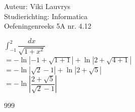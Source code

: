 \documentclass[a4paper]{article}
\begin{document}
  
\noindent \large Auteur: Viki	Lauvrys \\
\noindent \large Studierichting: Informatica\\
\noindent \large Oefeningenreeks 5A nr. 4.12\\

\medskip

\normalsize

$ \displaystyle\int^2_{-1} \dfrac{dx}{\sqrt{1 + x^2}} $ \\

$ = - \ln | -1 + \sqrt{1 + 1} | + \ln | 2 + \sqrt{4 + 1} | $ \\

$ = - \ln | \sqrt{2} - 1| + \ln | 2 + \sqrt{5} | $ \\

$ = - \ln \left| \dfrac{2 + \sqrt{5}}{\sqrt{2} - 1} \right| $ \\

\begin{thebibliography}{999}
\end{thebibliography}
\end{document}
